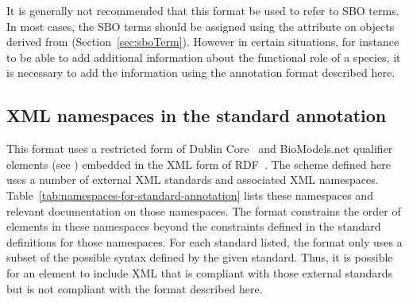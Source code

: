 It is generally not recommended that this format be used to refer
to SBO terms.  In most cases, the SBO terms should be assigned
using the attribute  on objects derived from \SBase
(Section~\ref{sec:sboTerm}).  However in certain situations, for
instance to be able to add additional information about the
functional role of a species, it is necessary to add the
information using the annotation format described here.


\subsection{XML namespaces in the standard annotation}

This format uses a restricted form of Dublin
Core~\citep{DCMI:2003} and BioModels.net qualifier elements (see
) embedded in the XML form
of RDF~\citep{w3c:2004}.  The scheme defined here uses a number of
external XML standards and associated XML namespaces.
Table~\ref{tab:namespaces-for-standard-annotation} lists these
namespaces and relevant documentation on those namespaces.  The
format constrains the order of elements in these namespaces beyond
the constraints defined in the standard definitions for those
namespaces.  For each standard listed, the format only uses a
subset of the possible syntax defined by the given standard.
Thus, it is possible for an  element to include
XML that is compliant with those external standards but is not
compliant with the format described here.

